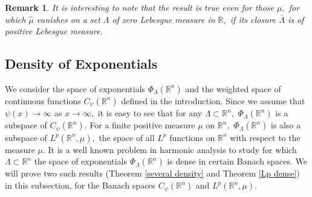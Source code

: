 \documentclass [11pt]{amsart}
\newtheorem{rem}{Remark}[section]
\newcommand{\R}{\mathbb R}
\numberwithin{equation}{section}
\begin{document}
\begin{rem}
It is interesting to note that the result is true even for those $\mu,$ for which $\widehat{\mu}$ vanishes on a set $\Lambda$ of zero Lebesgue measure in $\R,$ if its closure $\overline{\Lambda}$ is of positive Lebesgue measure.
\end{rem}

\subsection{Density of Exponentials}

We consider the space of exponentials $\Phi_{\Lambda}(\R^n)$ and the weighted space of continuous functions $C_\psi(\R^n)$ defined in the introduction. Since we assume that $\psi(x)\to \infty $ as $x\to \infty,$ it is easy to see that for any $\Lambda \subset \R^n,$ $\Phi_{\Lambda}(\R^n)$ is a subspace of $C_{\psi}(\R^n).$ For a finite positive measure $\mu$ on $\R^n,$ $\Phi_{\Lambda}(\R^n)$ is also a subspace of $L^p(\R^n, \mu),$ the space of all $L^p$ functions on $\R^n$ with respect to the measure $\mu.$ It is a well known problem in harmonic analysis to study for which $\Lambda\subset \R^n$ the space of exponentials $\Phi_{\Lambda}(\R^n)$ is dense in certain Banach spaces. We will prove two such results (Theorem \ref{several density} and Theorem \ref{Lp dense}) in this subsection, for the Banach spaces $C_\psi(\R^n)$ and $L^p(\R^n, \mu).$
\end{document}
